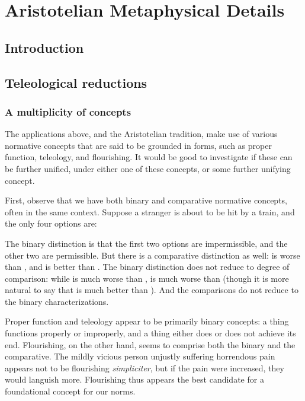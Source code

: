 \def\mychapter{XII}

\chapter{Aristotelian Metaphysical Details}\label{ch:details}
\section{Introduction}
\section{Teleological reductions}
\subsection{A multiplicity of concepts}
The applications above, and the Aristotelian tradition, make use of various normative concepts that are said to be grounded in forms,
such as proper function, teleology, and flourishing. It would be good to investigate if these 
can be further unified, under either one of these concepts, or some further unifying concept.

First, observe that we have both binary and comparative normative concepts, often in the same context.
Suppose a stranger is about to be hit by a train, and the only four options are:


The binary distinction is that
the first two options are impermissible, and the other two are permissible. But there is a comparative distinction
as well:  is worse than , and  is better than . The binary distinction does not reduce to
degree of comparison: while  is much worse than ,  is much worse than  (though 
it is more natural to say that  is much better than ). And the comparisons do not reduce to the binary 
characterizations.

Proper function and teleology appear to be primarily binary concepts: a thing functions properly or improperly, and a thing either 
does or does not achieve its end. Flourishing, on the other hand, seems to comprise both the binary and the comparative. The mildly
vicious person unjustly suffering horrendous pain appears not to be flourishing \textit{simpliciter}, but if the pain were increased,
they would languish more. Flourishing thus appears the best candidate for a foundational concept for our norms.

